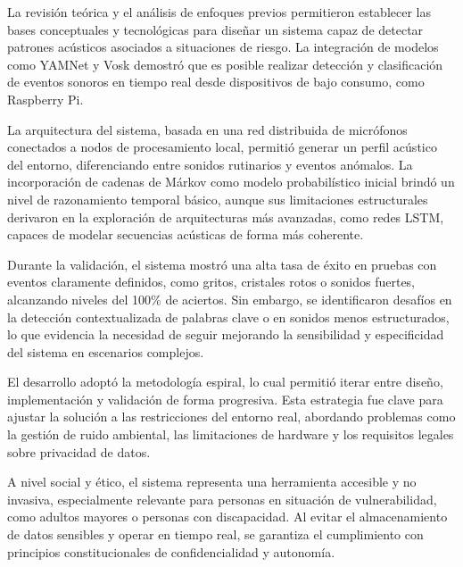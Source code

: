 
La revisión teórica y el análisis de enfoques previos permitieron establecer las bases conceptuales y tecnológicas para diseñar un sistema capaz de detectar patrones acústicos asociados a situaciones de riesgo. La integración de modelos como YAMNet y Vosk demostró que es posible realizar detección y clasificación de eventos sonoros en tiempo real desde dispositivos de bajo consumo, como Raspberry Pi.

La arquitectura del sistema, basada en una red distribuida de micrófonos conectados a nodos de procesamiento local, permitió generar un perfil acústico del entorno, diferenciando entre sonidos rutinarios y eventos anómalos. La incorporación de cadenas de Márkov como modelo probabilístico inicial brindó un nivel de razonamiento temporal básico, aunque sus limitaciones estructurales derivaron en la exploración de arquitecturas más avanzadas, como redes LSTM, capaces de modelar secuencias acústicas de forma más coherente.

Durante la validación, el sistema mostró una alta tasa de éxito en pruebas con eventos claramente definidos, como gritos, cristales rotos o sonidos fuertes, alcanzando niveles del 100\% de aciertos. Sin embargo, se identificaron desafíos en la detección contextualizada de palabras clave o en sonidos menos estructurados, lo que evidencia la necesidad de seguir mejorando la sensibilidad y especificidad del sistema en escenarios complejos.

El desarrollo adoptó la metodología espiral, lo cual permitió iterar entre diseño, implementación y validación de forma progresiva. Esta estrategia fue clave para ajustar la solución a las restricciones del entorno real, abordando problemas como la gestión de ruido ambiental, las limitaciones de hardware y los requisitos legales sobre privacidad de datos.

A nivel social y ético, el sistema representa una herramienta accesible y no invasiva, especialmente relevante para personas en situación de vulnerabilidad, como adultos mayores o personas con discapacidad. Al evitar el almacenamiento de datos sensibles y operar en tiempo real, se garantiza el cumplimiento con principios constitucionales de confidencialidad y autonomía.
